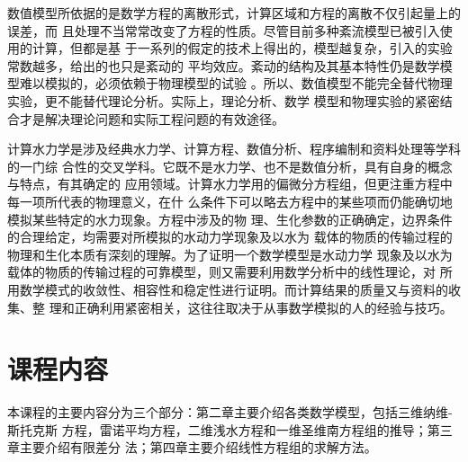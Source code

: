 数值模型所依据的是数学方程的离散形式，计算区域和方程的离散不仅引起量上的误差，而
且处理不当常常改变了方程的性质。尽管目前多种紊流模型已被引入使用的计算，但都是基
于一系列的假定的技术上得出的，模型越复杂，引入的实验常数越多，给出的也只是紊动的
平均效应。紊动的结构及其基本特性仍是数学模型难以模拟的，必须依赖于物理模型的试验
。所以、数值模型不能完全替代物理实验，更不能替代理论分析。实际上，理论分析、数学
模型和物理实验的紧密结合才是解决理论问题和实际工程问题的有效途径。

计算水力学是涉及经典水力学、计算方程、数值分析、程序编制和资料处理等学科的一门综
合性的交叉学科。它既不是水力学、也不是数值分析，具有自身的概念与特点，有其确定的
应用领域。计算水力学用的偏微分方程组，但更注重方程中每一项所代表的物理意义，在什
么条件下可以略去方程中的某些项而仍能确切地模拟某些特定的水力现象。方程中涉及的物
理、生化参数的正确确定，边界条件的合理给定，均需要对所模拟的水动力学现象及以水为
载体的物质的传输过程的物理和生化本质有深刻的理解。为了证明一个数学模型是水动力学
现象及以水为载体的物质的传输过程的可靠模型，则又需要利用数学分析中的线性理论，对
所用数学模式的收敛性、相容性和稳定性进行证明。而计算结果的质量又与资料的收集、整
理和正确利用紧密相关，这往往取决于从事数学模拟的人的经验与技巧。

\section{课程内容}
本课程的主要内容分为三个部分：第二章主要介绍各类数学模型，包括三维纳维-斯托克斯
方程，雷诺平均方程，二维浅水方程和一维圣维南方程组的推导；第三章主要介绍有限差分
法；第四章主要介绍线性方程组的求解方法。
